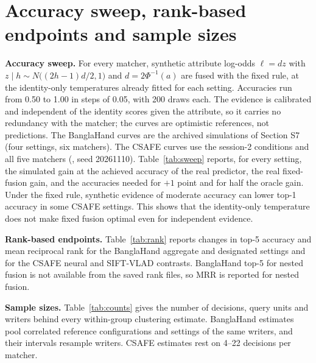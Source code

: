 \documentclass[10pt,a4paper]{article}
\begin{document}
\section{Accuracy sweep, rank-based endpoints and sample sizes}
\label{sec:supsweep}
\textbf{Accuracy sweep.} For every matcher, synthetic attribute log-odds $\ell=dz$ with $z\mid h\sim N\big((2h-1)d/2,1\big)$ and $d=2\Phi^{-1}(a)$ are fused with the fixed rule, at the identity-only temperatures already fitted for each setting. Accuracies run from 0.50 to 1.00 in steps of 0.05, with 200 draws each. The evidence is calibrated and independent of the identity scores given the attribute, so it carries no redundancy with the matcher; the curves are optimistic references, not predictions. The BanglaHand curves are the archived simulations of Section S7 (four settings, six matchers). The CSAFE curves use the session-2 conditions and all five matchers (, seed 20261110). Table~\ref{tab:sweep} reports, for every setting, the simulated gain at the achieved accuracy of the real predictor, the real fixed-fusion gain, and the accuracies needed for $+1$ point and for half the oracle gain. Under the fixed rule, synthetic evidence of moderate accuracy can lower top-1 accuracy in some CSAFE settings. This shows that the identity-only temperature does not make fixed fusion optimal even for independent evidence.

\textbf{Rank-based endpoints.} Table~\ref{tab:rank} reports changes in top-5 accuracy and mean reciprocal rank for the BanglaHand aggregate and designated settings and for the CSAFE neural and SIFT-VLAD contrasts. BanglaHand top-5 for nested fusion is not available from the saved rank files, so MRR is reported for nested fusion.

\textbf{Sample sizes.} Table~\ref{tab:counts} gives the number of decisions, query units and writers behind every within-group clustering estimate. BanglaHand estimates pool correlated reference configurations and settings of the same writers, and their intervals resample writers. CSAFE estimates rest on 4--22 decisions per matcher.
\end{document}
